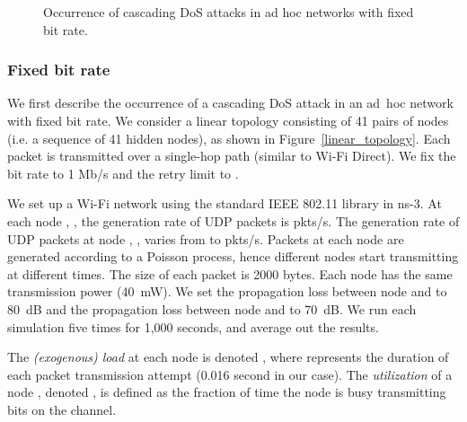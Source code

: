 \documentclass{IEEEtran}
\begin{document}
\begin{figure}[!t]
\centering
{}
\vfil {}
\caption{Occurrence of cascading DoS attacks in ad hoc networks with fixed bit rate.}
\label{The occurrence of cascading DoS attack in adhoc networks with fixed bitrate}
\end{figure}

\subsubsection{Fixed bit rate}
\label{EXP:Fixed bitrate}
We first describe the occurrence of a cascading DoS attack in an
ad~hoc network with fixed bit rate. We consider a linear topology
consisting of 41 pairs of nodes (i.e. a sequence of 41 hidden nodes), as shown in Figure~\ref{linear_topology}.
Each packet is transmitted over a single-hop path (similar to Wi-Fi Direct).
We fix the bit rate to 1 Mb/s and the retry limit to .


We set up a Wi-Fi network using the standard IEEE 802.11 library in ns-3.  At each node , ,
 the generation rate of UDP packets is  pkts/s. The
generation rate of UDP packets at node , , varies from  to 
pkts/s. Packets at each node are generated according to a Poisson process, hence different nodes start transmitting at different times.
The size
of each packet is 2000 bytes. Each node has the same transmission power
(40~mW).
We set the propagation loss between node  and  to
80~dB and the propagation loss between node  and 
to 70~dB.
We run each simulation five times for 1,000 seconds, and average out the results.

The \emph{(exogenous) load} at each node  is denoted , where  represents the duration of each packet transmission
attempt (0.016 second in our case).
The \emph{utilization} of a node , denoted , is defined as the
fraction of time the node is busy transmitting bits on the channel.
\end{document}
